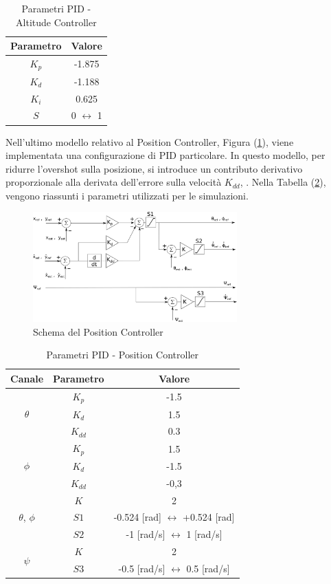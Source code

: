 \begin{table}
	\centering
	\begin{tabular}{c c}
		\hline
		Parametro & Valore \\
		\hline
		$K_p$ & -1.875 \\
		$K_d$ & -1.188\\
		$K_i$ & 0.625\\
		$S$ & 0 $\leftrightarrow$ 1\\
		\hline
	\end{tabular}	
	\caption{Parametri PID - Altitude Controller}
	\label{tab:PIDALT}
\end{table}

Nell'ultimo modello relativo al Position Controller, Figura (\ref{fig:PIDPosCTR}), viene implementata una configurazione di PID particolare. In questo modello, per ridurre l'overshot sulla posizione, si introduce un contributo derivativo proporzionale alla derivata dell'errore sulla velocità $K_{dd}$, \cite{DesTestCarm}. Nella Tabella (\ref{tab:PIDPOS}), vengono riassunti i parametri utilizzati per le simulazioni. 

\begin{figure}
	\centering
	\includegraphics[width=0.7\textwidth]{SistemaQuadrirotore/Figure/PIDPositionCtrl}
	\caption{Schema del Position Controller}
	\label{fig:PIDPosCTR}
\end{figure}

\begin{table}
	\centering
	\begin{tabular}{c c c}
		\hline
		 Canale & Parametro & Valore \\
		\hline
		\multirow{3}{*}{$\theta$}&$K_p$ & -1.5 \\
		&$K_d$ & 1.5\\
		&$K_{dd}$ & 0.3\\
		\hline
		\multirow{3}{*}{$\phi$}& $K_p$ & 1.5 \\
		&$K_d$ & -1.5\\
		&$K_{dd}$ & -0,3\\
		\hline
		\multirow{3}{*}{$\theta$, $\phi$}&$K$ & 2 \\ 
		&$S1$ & -0.524 [rad] $\leftrightarrow$ +0.524 [rad]\\
		&$S2$ & -1 [rad/s] $\leftrightarrow$ 1  [rad/s]\\
		\hline
		\multirow{2}{*}{$\psi$}&$K$ & 2 \\
		&$S3$ & -0.5 [rad/s] $\leftrightarrow$ 0.5 [rad/s]\\
		\hline
		
	\end{tabular}	
	\caption{Parametri PID - Position Controller}
	\label{tab:PIDPOS}
\end{table}

